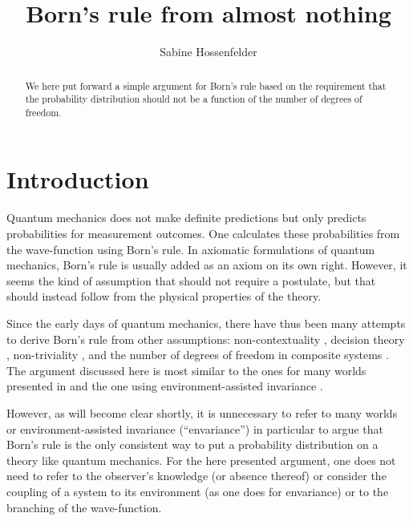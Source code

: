 \documentclass[12pt]{article}
\begin{document}
\title{Born's rule from almost nothing}
\author{Sabine Hossenfelder}
\date{}
\maketitle
\vspace*{-1cm}

\begin{abstract}
We here put forward a simple argument for Born's rule based on the requirement that the probability distribution should not be a function of the number of degrees of freedom.
\end{abstract} 

\section{Introduction}

Quantum mechanics does not make definite predictions but only predicts probabilities for measurement outcomes. One calculates these probabilities
from the wave-function using Born's rule. In axiomatic formulations of quantum mechanics, Born's rule is usually added as an
axiom on its own right. However, it seems the kind of assumption that should not require a postulate, but that should instead follow from
the physical properties of the theory. 

Since the early days of quantum mechanics, there have thus been many attempts to derive 
Born's rule from other assumptions: non-contextuality \cite{Gleason}, decision theory \cite{Deutsch}, non-triviality \cite{Aaronson}, and the number of degrees of freedom in composite systems \cite{Hardy,Masanes:2010tt,Brukner}. The argument discussed here is most similar to the ones for many worlds presented in \cite{Vaidman, Carroll:2014mea} and the one using environment-assisted invariance \cite{Zurek}. 

However, as will become clear shortly, it is unnecessary to refer to many worlds or environment-assisted invariance (“envariance”) in particular to argue that Born’s rule is the only consistent way to put a probability distribution on a theory like quantum mechanics. For the here presented argument, one does not need to refer to the observer’s knowledge (or absence thereof) or consider the coupling of a system to its environment (as one does for envariance) or to the branching of the wave-function.
\end{document}
